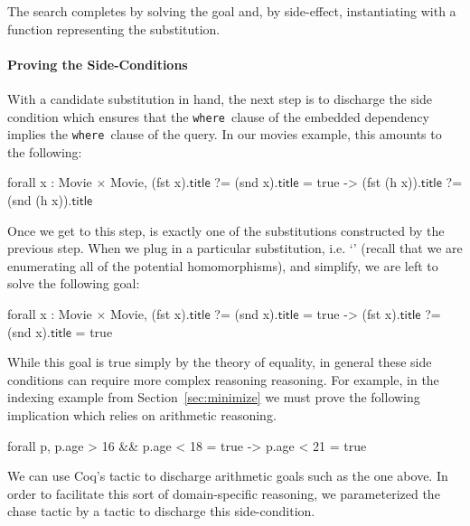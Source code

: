 \documentclass[preprint]{sigplanconf}
\newcommand{\WHERE}{{\tt where}\relax\ifmmode\ \else\xspace\fi}
\newcommand{\ltac}[0]{\ensuremath{\mathcal{L}_{\mathrm{tac}}}}
\begin{document}
The search completes by solving the goal and, by side-effect, instantiating  with a function representing the substitution.

\paragraph{Proving the Side-Conditions}
With a candidate substitution in hand, the next step is to discharge the side condition which ensures that the \WHERE clause of the embedded dependency implies the \WHERE clause of the query.
In our movies example, this amounts to the following: %
\begin{coq}
forall x : Movie $\times$ Movie, (fst x).$\textsf{title}$ ?= (snd x).$\textsf{title}$ = true
     -> (fst (h x)).$\textsf{title}$ ?= (snd (h x)).$\textsf{title}$
\end{coq}

Once we get to this step,  is exactly one of the substitutions constructed by the previous step.
When we plug in a particular substitution, i.e. `' (recall that we are enumerating all of the potential homomorphisms), and simplify, we are left to solve the following goal: %
\begin{coq}
forall x : Movie $\times$ Movie, (fst x).$\textsf{title}$ ?= (snd x).$\textsf{title}$ = true
     -> (fst x).$\textsf{title}$ ?= (snd x).$\textsf{title}$ = true
\end{coq}

While this goal is true simply by the theory of equality, in general these side conditions can require more complex reasoning reasoning.
For example, in the indexing example from Section~\ref{sec:minimize} we must prove the following implication which relies on arithmetic reasoning.
\begin{coq}
forall p, p.age > 16 && p.age < 18 = true ->
          p.age < 21 = true
\end{coq}
We can use Coq's  tactic to discharge arithmetic goals such as the one above.
In order to facilitate this sort of domain-specific reasoning, we parameterized the chase tactic by a tactic to discharge this side-condition.
\end{document}
